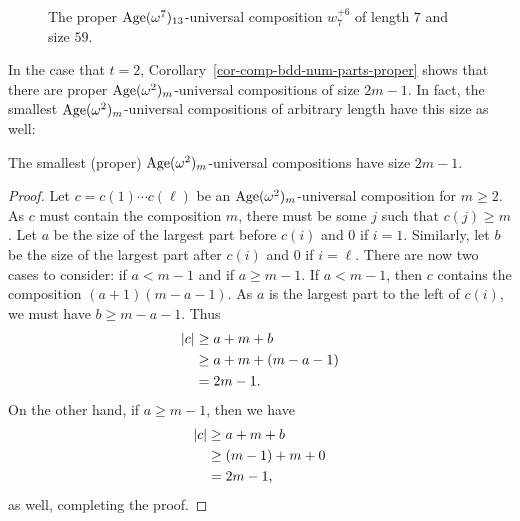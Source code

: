 \begin{figure}[ht]
\captionsetup{justification=centering}
\caption{The proper $\operatorname{Age}(\omega^7)_{13}$-universal composition $w_7^{+6}$ of length $7$ and size $59$.}
\label{fig-comp-bdd-num-parts}
\end{figure}

In the case that $t = 2$, Corollary~\ref{cor-comp-bdd-num-parts-proper} shows that there are proper $\operatorname{Age}(\omega^2)_m$-universal compositions of size $2m-1$. In fact, the smallest $\operatorname{Age}(\omega^2)_m$-universal compositions of arbitrary length have this size as well:

\begin{proposition}
\label{prop-comp-length-2-improper}
	The smallest (proper) $\operatorname{Age}(\omega^2)_m$-universal compositions have size $2m-1$.
\end{proposition}
\begin{proof}
	Let $c = c(1) \cdots c(\ell)$ be an $\operatorname{Age}(\omega^2)_m$-universal composition for $m \ge 2$. As $c$ must contain the composition $m$, there must be some $j$ such that $c(j) \ge m$. Let $a$ be the size of the largest part before $c(i)$ and $0$ if $i = 1$. Similarly, let $b$ be the size of the largest part after $c(i)$ and $0$ if $i = \ell$. There are now two cases to consider: if $a < m-1$ and if $a \ge m-1$. If $a < m-1$, then $c$ contains the composition $(a+1)(m-a-1)$. As $a$ is the largest part to the left of $c(i)$, we must have $b \ge m-a-1$. Thus
	\begin{align*}
		\left\lvert{c}\right\rvert
			&\ge a + m + b \\
			&\ge a + m + (m-a-1) \\
			&= 2m-1.
	\end{align*}
	On the other hand, if $a \ge m-1$, then we have
	\begin{align*}
		\left\lvert{c}\right\rvert
			&\ge   a   + m + b \\
			&\ge (m-1) + m + 0 \\
			&= 2m-1,
	\end{align*}
	as well, completing the proof.
\end{proof}


